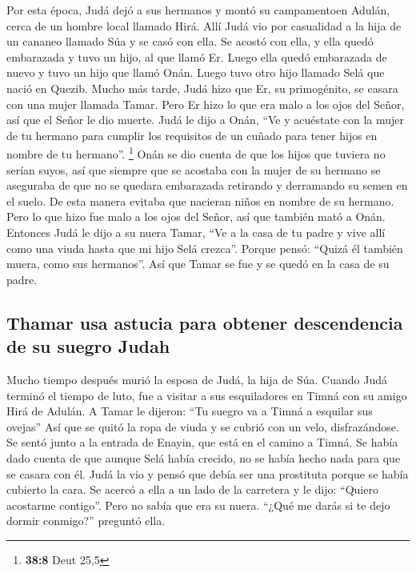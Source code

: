  Por esta época, Judá dejó a sus hermanos y montó su
campamentoen Adulán, cerca de un hombre local llamado Hirá.
 Allí Judá vio por casualidad a la hija de un cananeo
llamado Súa y se casó con ella. Se acostó con ella,  y
ella quedó embarazada y tuvo un hijo, al que llamó Er. 
Luego ella quedó embarazada de nuevo y tuvo un hijo que llamó Onán.
 Luego tuvo otro hijo llamado Selá que nació en Quezib.
 Mucho más tarde, Judá hizo que Er, su primogénito, se
casara con una mujer llamada Tamar.  Pero Er hizo lo que
era malo a los ojos del Señor, así que el Señor le dio muerte.
 Judá le dijo a Onán, ``Ve y acuéstate con la mujer de tu
hermano para cumplir los requisitos de un cuñado para tener hijos en
nombre de tu hermano''. \footnote{\textbf{38:8} Deut 25,5}
 Onán se dio cuenta de que los hijos que tuviera no serían
suyos, así que siempre que se acostaba con la mujer de su hermano se
aseguraba de que no se quedara embarazada retirando y derramando su
semen en el suelo. De esta manera evitaba que nacieran niños en nombre
de su hermano.  Pero lo que hizo fue malo a los ojos del
Señor, así que también mató a Onán.  Entonces Judá le
dijo a su nuera Tamar, ``Ve a la casa de tu padre y vive allí como una
viuda hasta que mi hijo Selá crezca''. Porque pensó: ``Quizá él también
muera, como sus hermanos''. Así que Tamar se fue y se quedó en la casa
de su padre.

\hypertarget{thamar-usa-astucia-para-obtener-descendencia-de-su-suegro-judah}{%
\subsection{Thamar usa astucia para obtener descendencia de su suegro
Judah}\label{thamar-usa-astucia-para-obtener-descendencia-de-su-suegro-judah}}

 Mucho tiempo después murió la esposa de Judá, la hija de
Súa. Cuando Judá terminó el tiempo de luto, fue a visitar a sus
esquiladores en Timná con su amigo Hirá de Adulán.  A
Tamar le dijeron: ``Tu suegro va a Timná a esquilar sus ovejas''
 Así que se quitó la ropa de viuda y se cubrió con un
velo, disfrazándose. Se sentó junto a la entrada de Enayin, que está en
el camino a Timná. Se había dado cuenta de que aunque Selá había
crecido, no se había hecho nada para que se casara con él.
 Judá la vio y pensó que debía ser una prostituta porque
se había cubierto la cara.  Se acercó a ella a un lado de
la carretera y le dijo: ``Quiero acostarme contigo''. Pero no sabía que
era su nuera. ``¿Qué me darás si te dejo dormir conmigo?'' preguntó
ella.

